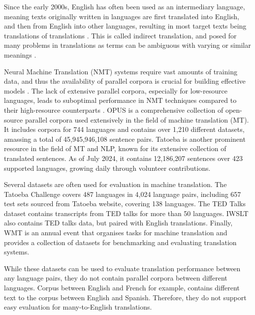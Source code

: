 \documentclass[a4paper]{article}
\begin{document}
Since the early 2000s, English has often been used as an intermediary language, meaning texts originally written in languages are first translated into English, and then from English into other languages, resulting in most target texts being translations of translations \cite{lefer-2020-parallel-corpora}. This is called indirect translation, and posed for many problems in translations as terms can be ambiguous with varying or similar meanings \cite{rosa-2017-indirect-translation-problems}.

Neural Machine Translation (NMT) systems require vast amounts of training data, and thus the availability of parallel corpora is crucial for building effective models \cite{koehn-2017-challenges}. The lack of extensive parallel corpora, especially for low-resource languages, leads to suboptimal performance in NMT techniques compared to their high-resource counterparts \cite{ranathunga-2023-nmt-low-res}. OPUS \cite{opus} is a comprehensive collection of open-source parallel corpora used extensively in the field of machine translation (MT). It includes corpora for 744 languages and contains over 1,210 different datasets, amassing a total of 45,945,946,108 sentence pairs. Tatoeba \cite{tatoeba} is another prominent resource in the field of MT and NLP, known for its extensive collection of translated sentences. As of July 2024, it contains 12,186,207 sentences over 423 supported languages, growing daily through volunteer contributions.

Several datasets are often used for evaluation in machine translation. The Tatoeba Challenge \cite{tiedemann-2020-tatoeba-challenge} covers 487 languages in 4,024 language pairs, including 657 test sets sourced from Tatoeba website, covering 138 languages. The TED Talks dataset \cite{ye-2018-word-embeddings-ted} contains transcripts from TED talks for more than 50 languages. IWSLT \cite{agarwal-iwstl-2023} also contains TED talks data, but paired with English translations. Finally, WMT \cite{barrault-2020-wmt} is an annual event that organises tasks for machine translation and provides a collection of datasets for benchmarking and evaluating translation systems.

While these datasets can be used to evaluate translation performance between any language pairs, they do not contain parallel corpora between different languages. Corpus between English and French for example, contains different text to the corpus between English and Spanish. Therefore, they do not support easy evaluation for many-to-English translations.
\end{document}
